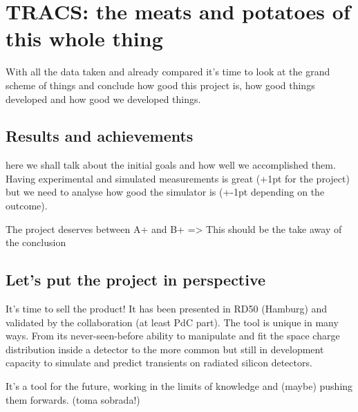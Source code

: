 \chapter{TRACS: the meats and potatoes of this whole thing}

With all the data taken and already compared it's time to look at the grand scheme of things and conclude how good this project is, how good things developed and how good we developed things.

\section{Results and achievements} %
\label{sec:results_and_achievements}

here we shall talk about the initial goals and how well we accomplished them. Having experimental and simulated measurements is great (+1pt for the project) but we need to analyse how good the simulator is (+-1pt depending on the outcome).

The project deserves between A+ and B+ => This should be the take away of the conclusion


\section{Let's put the project in perspective} %
\label{sec:let_s_put_the_project_in_perspective}

It's time to sell the product! It has been presented in RD50 (Hamburg) and validated by the collaboration (at least PdC part). The tool is unique in many ways. From its never-seen-before ability to manipulate and fit the space charge distribution inside a detector to the more common but still in development capacity to simulate and predict transients on radiated silicon detectors.

It's a tool for the future, working in the limits of knowledge and (maybe) pushing them forwards. (toma sobrada!)

